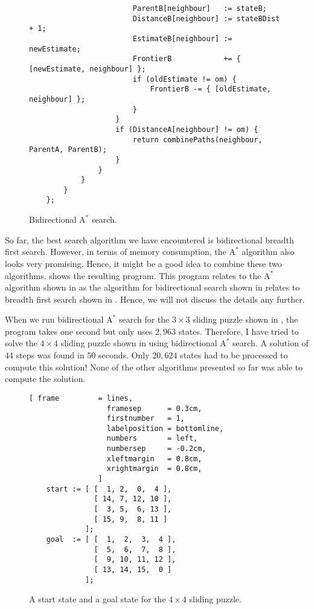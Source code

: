 \begin{figure}[!ht]
\begin{Verbatim}
                        ParentB[neighbour]   := stateB;
                        DistanceB[neighbour] := stateBDist + 1;
                        EstimateB[neighbour] := newEstimate;
                        FrontierB            += { [newEstimate, neighbour] };
                        if (oldEstimate != om) { 
                            FrontierB -= { [oldEstimate, neighbour] }; 
                        }
                    }
                    if (DistanceA[neighbour] != om) {
                        return combinePaths(neighbour, ParentA, ParentB);
                    }
                }        
            }
        }
    };
\end{Verbatim}
\vspace*{-0.3cm}
\caption{Bidirectional $\mathrm{A}^*$ search.}
\label{fig:a-star-bidirectional.stlx}
\end{figure}
So far, the best search algorithm we have encountered is bidirectional breadth first search.  However, in terms
of memory consumption, the $\mathrm{A}^*$ algorithm also looks very promising.  Hence, it might be a good idea
to combine these two algorithms.   shows the resulting program.  This program
relates to the $\mathrm{A}^*$ algorithm shown in  as the algorithm for bidirectional
search shown in  relates to breadth first search shown in .
Hence, we will not discuss the details any further.

When we run bidirectional $\mathrm{A}^*$ search for the $3 \times 3$ sliding puzzle shown in
, the program takes one second but only uses $2,963$ states.  Therefore, I have tried 
to solve the $4 \times 4$ sliding puzzle shown in  using
bidirectional $\mathrm{A}^*$ search.  A solution of $44$ steps was found in $50$ seconds.
Only $20,624$ states had to be processed to compute this solution!  None of the other algorithms presented so
far was able to compute the solution.



\begin{figure}[!ht]
\centering
\begin{Verbatim}[ frame         = lines, 
                  framesep      = 0.3cm, 
                  firstnumber   = 1,
                  labelposition = bottomline,
                  numbers       = left,
                  numbersep     = -0.2cm,
                  xleftmargin   = 0.8cm,
                  xrightmargin  = 0.8cm,
                ]
    start := [ [  1, 2,  0,  4 ],
               [ 14, 7, 12, 10 ],
               [  3, 5,  6, 13 ],
               [ 15, 9,  8, 11 ]
             ];
    goal  := [ [  1,  2,  3,  4 ],
               [  5,  6,  7,  8 ],
               [  9, 10, 11, 12 ],
               [ 13, 14, 15,  0 ]
             ];
\end{Verbatim}
\vspace*{-0.3cm}
\caption{A start state and a goal state for the $4 \times 4$ sliding puzzle.}
\label{fig:start-goal.stlx}
\end{figure}


